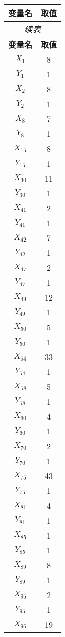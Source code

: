 \documentclass[a4paper,10pt]{article}
\begin{document}
\begin{center}
\begin{longtable}{cc}
\toprule
\textbf{变量名} & \textbf{取值} \\
\midrule
\endfirsthead
\multicolumn{2}{c}{\textit{续表}} \\
\toprule
\textbf{变量名} & \textbf{取值} \\
\midrule
\endhead
\bottomrule
\endfoot
\bottomrule
\endlastfoot
$X_{1}$ & 8 \\
$Y_{1}$ & 1 \\
$X_{2}$ & 8 \\
$Y_{2}$ & 1 \\
$X_{8}$ & 7 \\
$Y_{8}$ & 1 \\
$X_{15}$ & 8 \\
$Y_{15}$ & 1 \\
$X_{30}$ & 11 \\
$Y_{30}$ & 1 \\
$X_{41}$ & 2 \\
$Y_{41}$ & 1 \\
$X_{42}$ & 7 \\
$Y_{42}$ & 1 \\
$X_{47}$ & 2 \\
$Y_{47}$ & 1 \\
$X_{49}$ & 12 \\
$Y_{49}$ & 1 \\
$X_{50}$ & 5 \\
$Y_{50}$ & 1 \\
$X_{54}$ & 33 \\
$Y_{54}$ & 1 \\
$X_{58}$ & 5 \\
$Y_{58}$ & 1 \\
$X_{60}$ & 4 \\
$Y_{60}$ & 1 \\
$X_{70}$ & 2 \\
$Y_{70}$ & 1 \\
$X_{75}$ & 43 \\
$Y_{75}$ & 1 \\
$X_{81}$ & 4 \\
$Y_{81}$ & 1 \\
$X_{85}$ & 1 \\
$Y_{85}$ & 1 \\
$X_{89}$ & 8 \\
$Y_{89}$ & 1 \\
$X_{95}$ & 2 \\
$Y_{95}$ & 1 \\
$X_{96}$ & 19 \\

\end{longtable}
\end{center}
\end{document}
